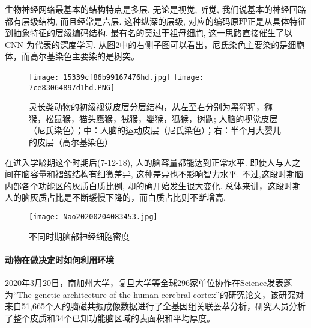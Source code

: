 \begin{itemize}
      生物神经网络最基本的结构特点是多层, 无论是视觉, 听觉, 我们说基本的神经回路都有层级结构, 而且经常是六层. 这种纵深的层级, 对应的编码原理正是从具体特征到抽象特征的层级编码结构.
      最有名的莫过于祖母细胞, 这一思路直接催生了以 CNN 为代表的深度学习. 从图\ref{Glutamine013001}中的右侧子图可以看出，尼氏染色主要染的是细胞体，而高尔基染色主要染的是树突。
    \begin{figure}[H]
    \begin{center}\quad
    \texttt{[image: 15339cf86b99167476hd.jpg]}
    \texttt{[image: 7ce83064897d1hd.PNG]}
    \end{center}
    \caption{灵长类动物的初级视觉皮层分层结构，从左至右分别为黑猩猩，猕猴，松鼠猴，猫头鹰猴，狨猴，婴猴，狐猴，树鼩; 人脑的视觉皮层（尼氏染色）；中：人脑的运动皮层（尼氏染色）；右：半个月大婴儿的皮层（高尔基染色）}
    \label{Glutamine013001}
    \end{figure}

在进入学龄期这个时期后(7-12-18), 人的脑容量都能达到正常水平. 即使人与人之间在脑容量和褶皱结构有细微差异, 这种差异也不影响智力水平. 不过,这段时期脑内部各个功能区的灰质白质比例, 却的确开始发生很大变化.
总体来讲，这段时期人的脑灰质占比是不断缓慢下降的，而白质占比则不断增高.
    \begin{figure}[H]
    \begin{center}\quad
    \texttt{[image: Nao20200204083453.jpg]}
    \end{center}
    \caption{不同时期脑部神经细胞密度}
    \label{Glutamine013001}
    \end{figure}
\paragraph{动物在做决定时如何利用环境}

2020年3月20日，南加州大学，复旦大学等全球296家单位协作在Science发表题为“The genetic architecture of the human cerebral cortex”的研究论文，该研究对来自51,665个人的脑磁共振成像数据进行了全基因组关联荟萃分析，研究人员分析了整个皮质和34个已知功能脑区域的表面积和平均厚度。


\end{itemize}

